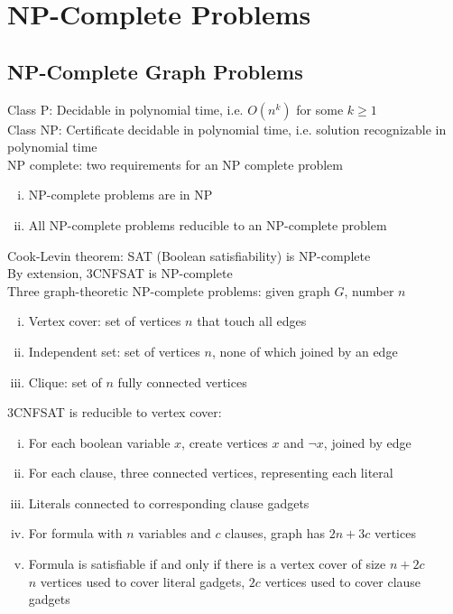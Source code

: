 \documentclass{article}
\begin{document}
	\section{NP-Complete Problems}
		\subsection{NP-Complete Graph Problems}
			Class P: Decidable in polynomial time, i.e. $O(n^k)$ for some $k \geq 1$ \\
			Class NP: Certificate decidable in polynomial time, i.e. solution recognizable in polynomial time \\
			NP complete: two requirements for an NP complete problem
			\begin{enumerate}[(i)]
				\item NP-complete problems are in NP
				\item All NP-complete problems reducible to an NP-complete problem
				\end{enumerate}
			Cook-Levin theorem: SAT (Boolean satisfiability) is NP-complete \\
			By extension, 3CNFSAT is NP-complete \\
			Three graph-theoretic NP-complete problems: given graph $G$, number $n$
			\begin{enumerate}[(i)]
				\item Vertex cover: set of vertices $n$ that touch all edges
				\item Independent set: set of vertices $n$, none of which joined by an edge
				\item Clique: set of $n$ fully connected vertices
				\end{enumerate}
			3CNFSAT is reducible to vertex cover:
			\begin{enumerate}[(i)]
				\item For each boolean variable $x$, create vertices $x$ and $\neg x$, joined by edge
				\item For each clause, three connected vertices, representing each literal
				\item Literals connected to corresponding clause gadgets
				\item For formula with $n$ variables and $c$ clauses, graph has $2n + 3c$ vertices
				\item Formula is satisfiable if and only if there is a vertex cover of size $n + 2c$ \\
				$n$ vertices used to cover literal gadgets, $2c$ vertices used to cover clause gadgets
				\end{enumerate}
\end{document}
